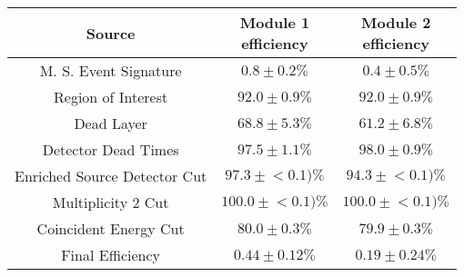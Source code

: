 \begin{tabular}{|c|c|c|}
\hline
  Source & \makecell{Module 1\\efficiency} & \makecell{Module 2\\efficiency} \\
\hline
  M. S. Event Signature & $0.8 \pm 0.2\%$ & $0.4 \pm 0.5\%$ \\
  Region of Interest & $92.0 \pm 0.9\%$ & $92.0 \pm 0.9\%$ \\
  Dead Layer & $68.8 \pm 5.3\%$ & $61.2 \pm 6.8\%$ \\
  Detector Dead Times & $97.5 \pm 1.1\%$ & $98.0 \pm 0.9\%$ \\
  Enriched Source Detector Cut & $97.3 \pm{}<\!0.1)\%$ & $94.3 \pm{}<\!0.1)\%$ \\
  Multiplicity 2 Cut & $100.0 \pm{}<\!0.1)\%$ & $100.0 \pm{}<\!0.1)\%$ \\
  Coincident Energy Cut & $80.0 \pm 0.3\%$ & $79.9 \pm 0.3\%$ \\
  \hline Final Efficiency & $0.44 \pm 0.12\%$ & $0.19 \pm 0.24\%$ \\
\hline
\end{tabular}
